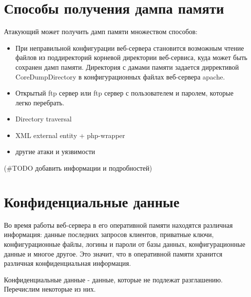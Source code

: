 \documentclass[20pt]{article}
\begin{document}
\newpage

\section{Способы получения дампа памяти}

Атакующий может получить дамп памяти множеством способов:
\begin{itemize}
  \item При неправильной конфигурации веб-сервера становится возможным чтение
  файлов из поддиректорий корневой директории веб-сервиса\cite{directory-listing},
  куда может быть сохранен дамп памяти. Директория с дамами памяти задается
  диррективой CoreDumpDirectory в конфигурационных файлах веб-сервера apache.
  \item Открытый ftp сервер или ftp сервер с пользователем и паролем, которые
  легко перебрать.
  \item Directory traversal\cite{directory-traversal}
  \item XML external entity\cite{xxe} + php-wrapper\cite{php-wrappers}
  \item другие атаки и уязвимости
\end{itemize}

(\#TODO добавить информации и подробностей)

\newpage

\section{Конфиденциальные данные}

Во время работы веб-сервера в его оперативной памяти находятся различная
информация: данные последних запросов клиентов, приватные ключи, конфигурационные
файлы, логины и пароли от базы данных, конфигурационные данные и многое другое.
Это значит, что в оперативной памяти хранится различная конфиденциальная информация.

Конфиденциальные данные - данные, которые не подлежат разглашению. Перечислим
некоторые из них.
\end{document}
